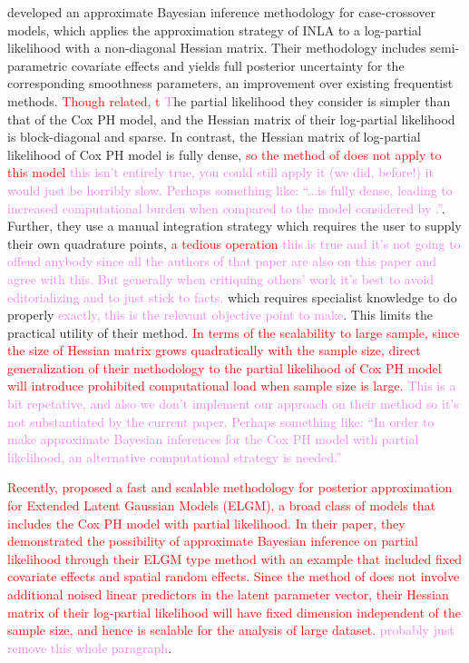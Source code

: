 \documentclass[ba]{imsart}
\newcommand{\highlight}[1]{\textcolor{red}{#1}}
\newcommand{\alex}[1]{\textcolor{violet}{{ }#1}}
\begin{document}
\cite{casecross} developed an approximate Bayesian inference methodology for case-crossover models, which applies the approximation strategy of INLA to a log-partial likelihood with a non-diagonal Hessian matrix. Their methodology includes semi-parametric covariate effects and yields full posterior uncertainty for the corresponding smoothness parameters, an improvement over existing frequentist methods. \highlight{Though related, t}\alex{T}he partial likelihood they consider is simpler than that of the Cox PH model, and the Hessian matrix of their log-partial likelihood is block-diagonal and sparse. In contrast, the Hessian matrix of log-partial likelihood of Cox PH model is fully dense, \highlight{so the method of \cite{casecross} does not apply to this model}\alex{this isn't entirely true, you could still apply it (we did, before!) it would just be horribly slow. Perhaps something like: ``...is fully dense, leading to increased computational burden when compared to the model considered by \cite{casecross}.''}. Further, they use a manual integration strategy which requires the user to supply their own quadrature points, \highlight{a tedious operation}\alex{this is true and it's not going to offend anybody since all the authors of that paper are also on this paper and agree with this. But generally when critiquing others' work it's best to avoid editorializing and to just stick to facts.} which requires specialist knowledge to do properly \alex{exactly, this is the relevant objective point to make}. This limits the practical utility of their method. \highlight{In terms of the scalability to large sample, since the size of Hessian matrix grows quadratically with the sample size, direct generalization of their methodology to the partial likelihood of Cox PH model will introduce prohibited computational load when sample size is large.}\alex{This is a bit repetative, and also we don't implement our approach on their method so it's not substantiated by the current paper. Perhaps something like: ``In order to make approximate Bayesian inferences for the Cox PH model with partial likelihood, an alternative computational strategy is needed.''}

\highlight{Recently, \cite{ELGM} proposed a fast and scalable methodology for posterior approximation for Extended Latent Gaussian Models (ELGM), a broad class of models that includes the Cox PH model with partial likelihood. In their paper, they demonstrated the possibility of approximate Bayesian inference on partial likelihood through their ELGM type method with an example that included fixed covariate effects and spatial random effects. Since the method of \cite{ELGM} does not involve additional noised linear predictors in the latent parameter vector, their Hessian matrix of their log-partial likelihood will have fixed dimension independent of the sample size, and hence is scalable for the analysis of large dataset.}\alex{probably just remove this whole paragraph}.
\end{document}
